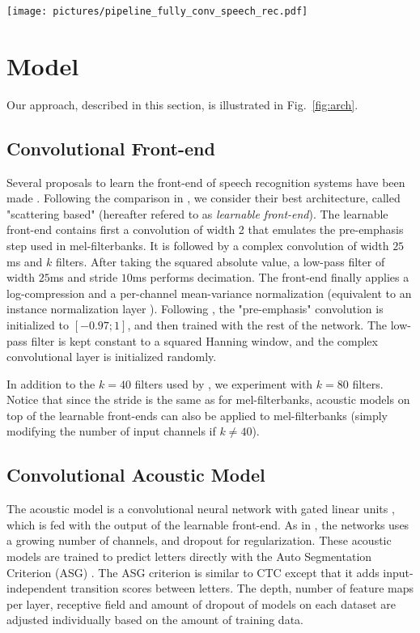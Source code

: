 \documentclass[a4paper]{article}
\begin{document}
\begin{figure*}
\texttt{[image: pictures/pipeline\_fully\_conv\_speech\_rec.pdf]}
\caption{Overview of the fully convolutional architecture.}
\label{fig:arch}
\end{figure*}
\section{Model}

Our approach, described in this section, is illustrated in Fig.~\ref{fig:arch}.

\label{sec:model}
\subsection{Convolutional Front-end}

Several proposals to learn the front-end of speech recognition systems have been made \cite{hoshen2015speech,sainath2015learning,tdfbanks1,tdfbanks2}. Following the comparison in \cite{tdfbanks2}, we consider their best architecture, called "scattering based" (hereafter refered to as \emph{learnable front-end}). The learnable front-end contains first a convolution of width 2 that emulates the pre-emphasis step used in mel-filterbanks. It is followed by a complex convolution of width $25$ms and $k$ filters. After taking the squared absolute value, a low-pass filter of width $25$ms and stride $10$ms performs de\-ci\-ma\-tion. The front-end finally applies a log-compression and a per-channel mean-variance normalization (equivalent to an instance normalization layer \cite{ulyanov2017instance}). Following \cite{tdfbanks2}, the "pre-emphasis" convolution is initialized to $[-0.97;1]$, and then trained with the rest of the network. The low-pass filter is kept constant to a squared Hanning window, and the complex convolutional layer is initialized randomly. 

In addition to the $k=40$ filters used by \cite{tdfbanks2}, we experiment with $k=80$ filters. Notice that since the stride is the same as for mel-filterbanks, acoustic models on top of the learnable front-ends can also be applied to mel-filterbanks (simply modifying the number of input channels if $k\neq 40$).

\subsection{Convolutional Acoustic Model}
The acoustic model is a convolutional neural network with gated linear units \cite{glu}, which is fed with the output of the learnable front-end. As in \cite{wav2letter2}, the networks uses a growing number of channels, and dropout \cite{dropout} for regula\-rization. These acoustic models are trained to predict letters directly with the Auto Segmentation Criterion (ASG) \cite{wav2letter}. 
The ASG criterion is similar to CTC \cite{CTC} except that it adds input-independent transition scores between letters.
The depth, number of feature maps per layer, receptive field and amount of dropout of models on each dataset are adjusted individually based on the amount of training data.
\end{document}
